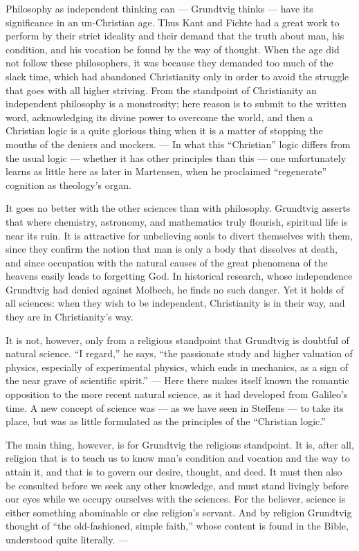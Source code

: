 \documentclass[12pt,a4paper]{book}
\newcommand{\opage}[1]{\marginnote{\footnotesize\textit{[#1]}}}
\begin{document}
Philosophy as independent thinking can --- Grundtvig thinks --- have its significance
in an un-Christian age. Thus Kant and Fichte had a great work to perform by their
strict ideality and their demand that the truth about man, his condition, and his
vocation be found by the way of thought. When the age did not follow these
philosophers, it was because they demanded too much of the slack time, which had
abandoned Christianity only in order to avoid the struggle that goes with all higher
striving. From the standpoint of Christianity an independent philosophy is a
monstrosity; here reason is to submit to the written word, acknowledging its divine
power to overcome the world, and then a Christian logic is a quite glorious thing when
it is a matter of stopping the mouths of the deniers and mockers. --- In what this
``Christian'' logic differs from the usual logic --- whether it has other principles
than this --- one unfortunately learns as little here as later in Martensen, when he
proclaimed ``regenerate'' cognition as theology's organ.

It goes no better with the other sciences than with philosophy. Grundtvig asserts that
where chemistry, astronomy, and mathematics truly flourish, spiritual life is near its
ruin. It is attractive for unbelieving souls to divert themselves with them, since
they confirm the notion that man is only a body that dissolves at death, and since
occupation with the natural causes of the great phenomena of the heavens easily leads
to forgetting God. In historical research, whose independence Grundtvig had denied
against Molbech, he finds no such danger. Yet it holds of all sciences: when they wish
to be independent, Christianity is in their way, and they are in Christianity's way.

It is not, however, only from a religious standpoint that Grundtvig is doubtful of
natural science. ``I regard,'' he says, ``\opage{63}the passionate study and higher valuation of
physics, especially of experimental physics, which ends in mechanics, as a sign of the
near grave of scientific spirit.'' --- Here there makes itself known the romantic
opposition to the more recent natural science, as it had developed from Galileo's
time. A new concept of science was --- as we have seen in Steffens --- to take its
place, but was as little formulated as the principles of the ``Christian logic.''

The main thing, however, is for Grundtvig the religious standpoint. It is, after all,
religion that is to teach us to know man's condition and vocation and the way to
attain it, and that is to govern our desire, thought, and deed. It must then also be
consulted before we seek any other knowledge, and must stand livingly before our eyes
while we occupy ourselves with the sciences. For the believer, science is either
something abominable or else religion's servant. And by religion Grundtvig thought of
``the old-fashioned, simple faith,'' whose content is found in the Bible, understood
quite literally. ---
\end{document}
